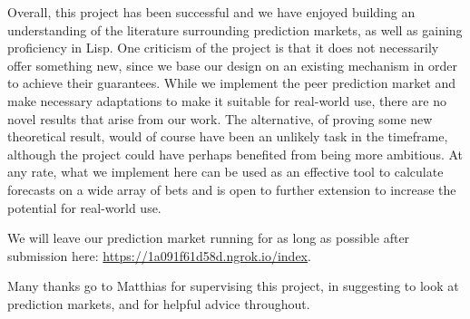 Overall, this project has been successful and we have enjoyed building an
understanding of the literature surrounding prediction markets, as well as
gaining proficiency in Lisp. One criticism of the project is that it does not
necessarily offer something new, since we base our design on an existing
mechanism in order to achieve their guarantees. While we implement the peer
prediction market and make necessary adaptations to make it suitable for
real-world use, there are no novel results that arise from our work. The
alternative, of proving some new theoretical result, would of course have been
an unlikely task in the timeframe, although the project could have perhaps
benefited from being more ambitious. At any rate, what we implement here can
be used as an effective tool to calculate forecasts on a wide array of bets and
is open to further extension to increase the potential for real-world use.

We will leave our prediction market running for as long as possible after
submission here: \url{https://1a091f61d58d.ngrok.io/index}.

Many thanks go to Matthias for supervising this project, in suggesting to look
at prediction markets, and for helpful advice throughout.
